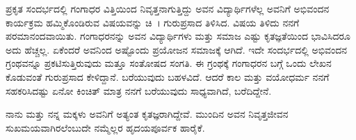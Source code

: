 {ಪ್ರಕೃತ ಸಂದರ್ಭದಲ್ಲಿ ಗಂಗಾಧರ ವಿತ್ತಿಯಿಂದ ನಿವೃತ್ತನಾಗುತ್ತಿದ್ದು ಅವನ ವಿದ್ಯಾರ್ಥಿ\-ಗಳೆಲ್ಲ ಅವನಿಗೆ ಅಭಿವಂದನ ಕಾರ್ಯಕ್ರಮ ಹಮ್ಮಿಕೊಂಡಿರುವ ವಿಷಯವನ್ನು ಚಿ~। ಗುರುಪ್ರಸಾದ ತಿಳಿಸಿದ. ವಿಷಯ ತಿಳಿದು ನನಗೆ ಪರಮಾನಂದವಾಯಿತು. ಗಂಗಾಧರನನ್ನು ಅವನ ವಿದ್ಯಾರ್ಥಿಗಳು ಮತ್ತು ಸಮಾಜ ಎಷ್ಟು ಕೃತಜ್ಞತೆಯಿಂದ ಭಾವಿಸಿದರೂ ಅದು ಹೆಚ್ಚಲ್ಲ. ಏಕೆಂದರೆ ಅವನಿಂದ ಅಷ್ಟೊಂದು ಪ್ರಯೋಜನ ಸಮಾಜಕ್ಕೆ ಆಗಿದೆ. ಇದೇ ಸಂದರ್ಭದಲ್ಲಿ ಅಭಿವಂದನ ಗ್ರಂಥವನ್ನೂ ಪ್ರಕಟಿಸುತ್ತಿರುವುದು ಮತ್ತೂ ಸಂತೋಷದ ಸಂಗತಿ. ಈ ಗ್ರಂಥಕ್ಕೆ ಗಂಗಾಧರನ ಬಗ್ಗೆ ಒಂದು ಲೇಖನ ಕೊಡುವಂತೆ ಗುರುಪ್ರಸಾದ ಕೇಳಿದ್ದಾನೆ. ಬರೆಯುವುದು ಬಹಳವಿದೆ. ಆದರೆ ಕಾಲ ಮತ್ತು ವಯೋಧರ್ಮ ನನಗೆ ಸಹಕರಿಸಿದಷ್ಟು   \enginline{-}   ಏನೋ ಕಿಂಚಿತ್ ಮಾತ್ರ ನನಗೆ ಬರೆಯುವುದು ಸಾಧ್ಯವಾಗಿದೆ, ಬರೆದಿದ್ದೇನೆ.  

ನಾನು ಮತ್ತು ನನ್ನ ಮಕ್ಕಳು ಅವನಿಗೆ ಅತ್ಯಂತ ಕೃತಜ್ಞರಾಗಿದ್ದೇವೆ. ಮುಂದಿನ ಅವನ ನಿವೃತ್ತಜೀವನ ಸುಖಮಯವಾಗಿರಲೆಂಬುದೇ ನಮ್ಮೆಲ್ಲರ ಹೃದಯಪೂರ್ವಕ ಹಾರೈಕೆ.

\articleend	
}
